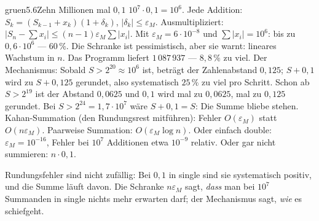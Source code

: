 \begin{loesungkarte}{gruen}{5.6}{Zehn Millionen mal $0{,}1$}
$10^{7}\cdot0{,}1 = 10^{6}$.
Jede Addition: $S_k = (S_{k-1} + x_k)(1 + \delta_k)$, $|\delta_k|\le\varepsilon_M$. Ausmultipliziert: $|S_n - \sum x_i|\le(n - 1)\varepsilon_M\sum|x_i|$. Mit $\varepsilon_M = 6\cdot10^{-8}$ und $\sum|x_i| = 10^{6}$: bis zu $0{,}6\cdot10^{6}$ --- $60\,\%$. Die Schranke ist pessimistisch, aber sie warnt: lineares Wachstum in $n$.
Das Programm liefert $1\,087\,937$ --- $8{,}8\,\%$ zu viel. Der Mechanismus: Sobald $S > 2^{20}\approx10^{6}$ ist, beträgt der Zahlenabstand $0{,}125$; $S + 0{,}1$ wird zu $S + 0{,}125$ gerundet, also systematisch $25\,\%$ zu viel pro Schritt. Schon ab $S > 2^{19}$ ist der Abstand $0{,}0625$ und $0{,}1$ wird mal zu $0{,}0625$, mal zu $0{,}125$ gerundet. Bei $S > 2^{24} = 1{,}7\cdot10^{7}$ wäre $S + 0{,}1 = S$: Die Summe bliebe stehen.
Kahan-Summation (den Rundungsrest mitführen): Fehler $O(\varepsilon_M)$ statt $O(n\varepsilon_M)$. Paarweise Summation: $O(\varepsilon_M\log n)$. Oder einfach double: $\varepsilon_M = 10^{-16}$, Fehler bei $10^{7}$ Additionen etwa $10^{-9}$ relativ. Oder gar nicht summieren: $n\cdot0{,}1$.
\begin{mitnehmen}\kastentext
Rundungsfehler sind nicht zufällig: Bei $0{,}1$ in single sind sie systematisch positiv, und die Summe läuft davon. Die Schranke $n\varepsilon_M$ sagt, \emph{dass} man bei $10^{7}$ Summanden in single nichts mehr erwarten darf; der Mechanismus sagt, \emph{wie} es schiefgeht.
\end{mitnehmen}
\end{loesungkarte}

